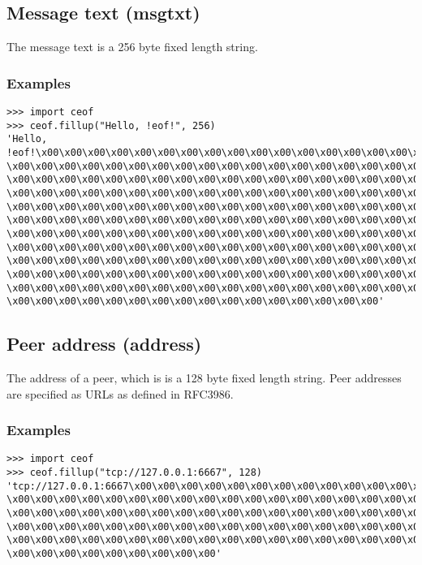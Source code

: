 \subsection{Message text (msgtxt)}
The message text is a 256 byte fixed length string.
\subsubsection{Examples}
\begin{verbatim}
>>> import ceof
>>> ceof.fillup("Hello, !eof!", 256)
'Hello, !eof!\x00\x00\x00\x00\x00\x00\x00\x00\x00\x00\x00\x00\x00\x00\x00\x00\x00\x00
\x00\x00\x00\x00\x00\x00\x00\x00\x00\x00\x00\x00\x00\x00\x00\x00\x00\x00\x00\x00\x00
\x00\x00\x00\x00\x00\x00\x00\x00\x00\x00\x00\x00\x00\x00\x00\x00\x00\x00\x00\x00\x00
\x00\x00\x00\x00\x00\x00\x00\x00\x00\x00\x00\x00\x00\x00\x00\x00\x00\x00\x00\x00\x00
\x00\x00\x00\x00\x00\x00\x00\x00\x00\x00\x00\x00\x00\x00\x00\x00\x00\x00\x00\x00\x00
\x00\x00\x00\x00\x00\x00\x00\x00\x00\x00\x00\x00\x00\x00\x00\x00\x00\x00\x00\x00\x00
\x00\x00\x00\x00\x00\x00\x00\x00\x00\x00\x00\x00\x00\x00\x00\x00\x00\x00\x00\x00\x00
\x00\x00\x00\x00\x00\x00\x00\x00\x00\x00\x00\x00\x00\x00\x00\x00\x00\x00\x00\x00\x00
\x00\x00\x00\x00\x00\x00\x00\x00\x00\x00\x00\x00\x00\x00\x00\x00\x00\x00\x00\x00\x00
\x00\x00\x00\x00\x00\x00\x00\x00\x00\x00\x00\x00\x00\x00\x00\x00\x00\x00\x00\x00\x00
\x00\x00\x00\x00\x00\x00\x00\x00\x00\x00\x00\x00\x00\x00\x00\x00\x00\x00\x00\x00\x00
\x00\x00\x00\x00\x00\x00\x00\x00\x00\x00\x00\x00\x00\x00\x00\x00'
\end{verbatim}
\subsection{Peer address (address)}
The address of a peer, which is is a 128 byte fixed length string. 
Peer addresses are specified as URLs as defined in RFC3986\cite{rfc3986}. 
\subsubsection{Examples}
\begin{verbatim}
>>> import ceof
>>> ceof.fillup("tcp://127.0.0.1:6667", 128)
'tcp://127.0.0.1:6667\x00\x00\x00\x00\x00\x00\x00\x00\x00\x00\x00\x00\x00\x00\x00
\x00\x00\x00\x00\x00\x00\x00\x00\x00\x00\x00\x00\x00\x00\x00\x00\x00\x00\x00\x00\x00
\x00\x00\x00\x00\x00\x00\x00\x00\x00\x00\x00\x00\x00\x00\x00\x00\x00\x00\x00\x00\x00
\x00\x00\x00\x00\x00\x00\x00\x00\x00\x00\x00\x00\x00\x00\x00\x00\x00\x00\x00\x00\x00
\x00\x00\x00\x00\x00\x00\x00\x00\x00\x00\x00\x00\x00\x00\x00\x00\x00\x00\x00\x00\x00
\x00\x00\x00\x00\x00\x00\x00\x00\x00'
\end{verbatim}
